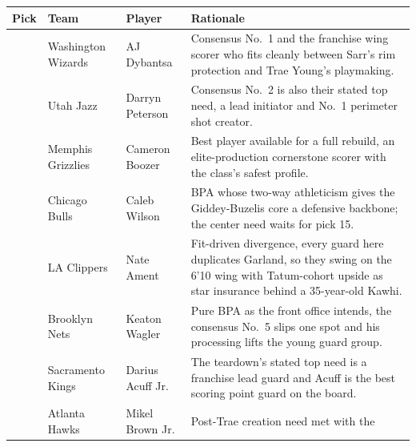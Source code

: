 \documentclass[
  10pt,
]{article}
\newcounter{none} %
\begin{document}
{\def\LTcaptype{none} %
\begin{longtable}[]{@{}
  >{\raggedright\arraybackslash}p{}
  >{\raggedright\arraybackslash}p{}
  >{\raggedright\arraybackslash}p{}
  >{\raggedright\arraybackslash}p{}@{}}
\toprule\noalign{}
\begin{minipage}[b]{\linewidth}\raggedright
Pick
\end{minipage} & \begin{minipage}[b]{\linewidth}\raggedright
Team
\end{minipage} & \begin{minipage}[b]{\linewidth}\raggedright
Player
\end{minipage} & \begin{minipage}[b]{\linewidth}\raggedright
Rationale
\end{minipage} \\
\midrule\noalign{}
\endhead
\bottomrule\noalign{}
\endlastfoot
1 & Washington Wizards & AJ Dybantsa & Consensus No.~1 and the franchise wing
scorer who fits cleanly between Sarr's rim protection and Trae Young's
playmaking. \\
2 & Utah Jazz & Darryn Peterson & Consensus No.~2 is also their stated top need,
a lead initiator and No.~1 perimeter shot creator. \\
3 & Memphis Grizzlies & Cameron Boozer & Best player available for a full
rebuild, an elite-production cornerstone scorer with the class's safest
profile. \\
4 & Chicago Bulls & Caleb Wilson & BPA whose two-way athleticism gives the
Giddey-Buzelis core a defensive backbone; the center need waits for pick 15. \\
5 & LA Clippers & Nate Ament & Fit-driven divergence, every guard here
duplicates Garland, so they swing on the 6'10 wing with Tatum-cohort upside as
star insurance behind a 35-year-old Kawhi. \\
6 & Brooklyn Nets & Keaton Wagler & Pure BPA as the front office intends, the
consensus No.~5 slips one spot and his processing lifts the young guard
group. \\
7 & Sacramento Kings & Darius Acuff Jr. & The teardown's stated top need is a
franchise lead guard and Acuff is the best scoring point guard on the board. \\
8 & Atlanta Hawks & Mikel Brown Jr. & Post-Trae creation need met with the

\end{longtable}}
\end{document}
